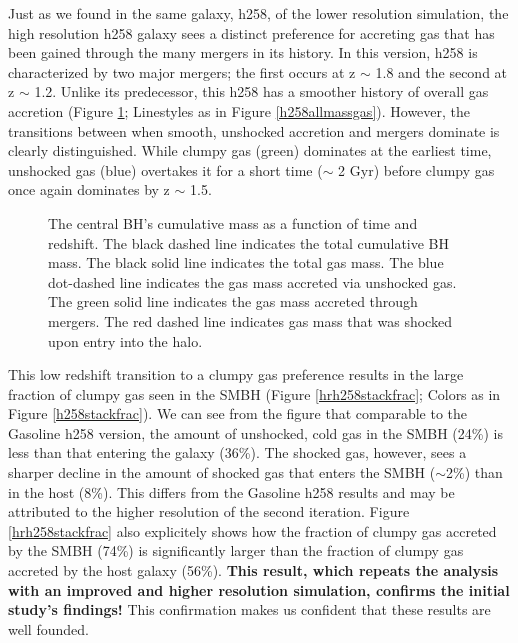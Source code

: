\documentclass[12pt,headA,chapB]{fiskthesis}
\begin{document}
Just as we found in the same galaxy, h258, of the lower resolution simulation, the high resolution h258 galaxy sees a distinct preference for accreting gas that has been gained through the many mergers in its history. In this version, h258 is characterized by two major mergers; the first occurs at z $\sim$ 1.8 and the second at z $\sim$ 1.2. Unlike its predecessor, this h258 has a smoother history of overall gas accretion (Figure \ref{hrh258allmassgas}; Linestyles as in Figure \ref{h258allmassgas}). However, the transitions between when smooth, unshocked accretion and mergers dominate is clearly distinguished. While clumpy gas (green) dominates at the earliest time, unshocked gas (blue) overtakes it for a short time ($\sim$ 2 Gyr) before clumpy gas once again dominates by z $\sim$ 1.5. 

\begin{figure} [h]
\centerline{}
\caption[ChaNGa h258 SMBH Cumulative Mass]{The central BH’s cumulative mass as a function of time and redshift. The black dashed line indicates the total cumulative BH mass. The black solid line indicates the total gas mass. The blue dot-dashed line indicates the gas mass accreted via unshocked gas. The green solid line indicates the gas mass accreted through mergers. The red dashed line indicates gas mass that was shocked upon entry into the halo.}
\label{hrh258allmassgas} 
\end{figure}

This low redshift transition to a clumpy gas preference results in the large fraction of clumpy gas seen in the SMBH (Figure \ref{hrh258stackfrac}; Colors as in Figure \ref{h258stackfrac}). We can see from the figure that comparable to the Gasoline h258 version, the amount of unshocked, cold gas in the SMBH (24\%) is less than that entering the galaxy (36\%). The shocked gas, however, sees a sharper decline in the amount of shocked gas that enters the SMBH ($\sim$2\%) than in the host (8\%). This differs from the Gasoline h258 results and may be attributed to the higher resolution of the second iteration. Figure \ref{hrh258stackfrac} also explicitely shows how the fraction of clumpy gas accreted by the SMBH (74\%) is significantly larger than the fraction of clumpy gas accreted by the host galaxy (56\%).  \textbf{This result, which repeats the analysis with an improved and higher resolution simulation, confirms the initial study's findings!} This confirmation makes us confident that these results are well founded. 
\end{document}
